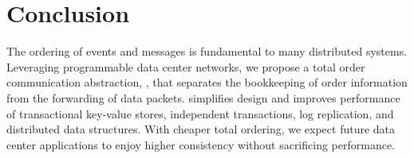 \section{Conclusion}
\label{sec:conclusion}

The ordering of events and messages is fundamental to many distributed systems.
Leveraging programmable data center networks, we propose a total order communication abstraction, \sys{}, that separates the bookkeeping of order information from the forwarding of data packets.
\sys{} simplifies design and improves performance of transactional key-value stores, independent transactions, log replication, and distributed data structures.
With cheaper total ordering, we expect future data center applications to enjoy higher consistency without sacrificing performance.